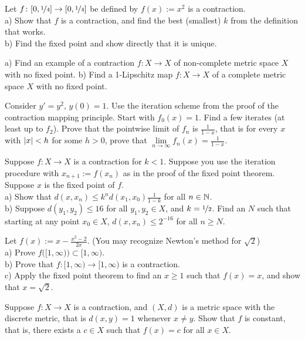 \begin{exercise}
Let $f \colon [0,\nicefrac{1}{4}] \to [0,\nicefrac{1}{4}]$ be defined by
$f(x) := x^2$ is a contraction.\\
a) Show that $f$
is a contraction, and find the best (smallest) $k$ from the definition that works.\\
b) Find the fixed point and show directly that it is unique.
\end{exercise}

\begin{exercise} \label{exercise:nofixedpoint}
a) Find an example of a contraction $f \colon X \to X$
of non-complete metric space $X$ with no
fixed point.
b) Find a 1-Lipschitz map $f \colon X \to X$ of a complete metric space $X$ with no fixed point.
\end{exercise}

\begin{exercise}
Consider $y' =y^2$, $y(0)=1$.  Use the iteration scheme
from the proof of the contraction mapping principle.
Start with $f_0(x) = 1$.  Find a 
few iterates (at least up to $f_2$).  Prove that
the pointwise limit of $f_n$ is $\frac{1}{1-x}$, that is for every $x$
with $\left\lvert {x} \right\rvert < h$ for some $h > 0$,
prove that $\lim\limits_{n\to\infty}f_n(x) = \frac{1}{1-x}$.
\end{exercise}

\begin{exercise}
Suppose $f \colon X \to X$ is a contraction for $k < 1$.  Suppose you use the iteration
procedure with $x_{n+1} := f(x_n)$ as in the proof of the fixed point theorem.
Suppose $x$ is the fixed
point of $f$.\\
a) Show that $d(x,x_n) \leq k^n d(x_1,x_0) \frac{1}{1-k}$ for all $n \in {\mathbb{N}}$.\\
b) Suppose $d(y_1,y_2) \leq 16$ for all $y_1,y_2 \in X$, and $k=
\nicefrac{1}{2}$.  Find an $N$ such that starting at any point $x_0 \in X$, 
$d(x,x_n) \leq 2^{-16}$ for all $n \geq N$.
\end{exercise}

\begin{exercise}
Let $f(x) := x-\frac{x^2-2}{2x}$. (You may recognize Newton's method for
$\sqrt{2}$)\\
a) Prove $f\bigl([1,\infty)\bigr) \subset [1,\infty)$.\\
b) Prove that $f \colon [1,\infty) \to [1,\infty)$ is a contraction.\\
c) Apply the fixed point theorem to find an $x \geq 1$ such that
$f(x) = x$, and show that $x = \sqrt{2}$.
\end{exercise}

\begin{exercise}
Suppose $f \colon X \to X$ is a contraction, and $(X,d)$ is a metric space
with the discrete metric, that is $d(x,y) = 1$ whenever $x \not= y$.
Show that $f$ is constant, that is,
there exists a $c \in X$ such that $f(x) = c$ for all $x \in X$.
\end{exercise}
